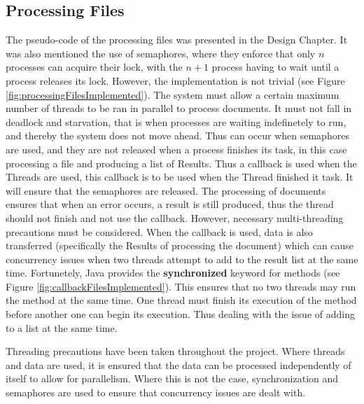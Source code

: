 \subsection{Processing Files}
\par The pseudo-code of the processing files was presented in the Design Chapter. It was also mentioned the use of semaphores, where they enforce that only $n$ processes can acquire their lock, with the $n+1$ process having to wait until a process releases its lock. However, the implementation is not trivial (see Figure \ref{fig:processingFilesImplemented}). The system must allow a certain maximum number of threads to be ran in parallel to process documents. It must not fall in deadlock and starvation, that is when processes are waiting indefinetely to run, and thereby the system does not move ahead. Thus can occur when semaphores are used, and they are not released when a process finishes its task, in this case processing a file and producing a list of Results. Thus a callback is used when the Threads are used, this callback is to be used when the Thread finished it task. It will ensure that the semaphores are released. The processing of documents ensures that when an error occurs, a result is still produced, thus the thread should not finish and not use the callback. However, necessary multi-threading precautions must be considered. When the callback is used, data is also transferred (specifically the Results of processing the document) which can cause concurrency issues when two threads attempt to add to the result list at the same time. Fortunetely, Java provides the \textbf{synchronized} keyword for methods (see Figure \ref{fig:callbackFilesImplemented}). This ensures that no two threads may run the method at the same time. One thread must finish its execution of the method before another one can begin its execution. Thus dealing with the issue of adding to a list at the same time. 
\par Threading precautions have been taken throughout the project. Where threads and data are used, it is ensured that the data can be processed independently of itself to allow for parallelism. Where this is not the case, synchronization and semaphores are used to ensure that concurrency issues are dealt with.
